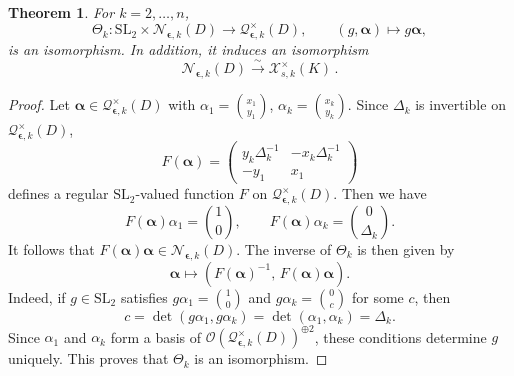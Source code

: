 \documentclass[12pt,reqno]{amsart}
\newcommand{\BC}{\mathbb{C}}
\newcommand{\calN}{\mathcal{N}}
\newcommand{\calQ}{\mathcal{Q}}
\newcommand{\calX}{\mathcal{X}}
\newcommand{\SL}{\mathrm{SL}}
\newcommand{\Spec}{\mathrm{Spec}}
\newtheorem{theorem}{Theorem}[section]
\theoremstyle{definition}
\begin{document}
	
	\begin{theorem} \label{thm:normalizedchart}
		For $k=2,\ldots,n$, 
		$$
		\Theta_k: \SL_2 \times\calN_{\boldsymbol{\epsilon},k}(D)\longrightarrow \calQ^\times_{{\boldsymbol{\epsilon}},k}(D),\qquad
		(g,\boldsymbol{\alpha})\longmapsto g\boldsymbol{\alpha},
		$$
		is an isomorphism.  %
		In addition, it induces an isomorphism
		$$
		\calN_{\boldsymbol{\epsilon},k}(D) \overset{\sim}{\longrightarrow} \calX_{s,k}^\times(K)\,.
		$$
	\end{theorem}
	
	\begin{proof}
		Let	$\boldsymbol{\alpha}\in \calQ^\times_{{\boldsymbol{\epsilon}},k}(D)$ with $
		\alpha_{1}	= \binom{x_1}{y_1}$, $\alpha_{k} =\binom{x_{k}}{y_{k}}$.
		Since $\Delta_k$ is invertible on $\calQ^\times_{{\boldsymbol{\epsilon}},k}(D)$,
		$$
		F(\boldsymbol{\alpha}) 	=
		\begin{pmatrix}
			y_{k}\Delta_k^{-1}	& 	-x_{k}\Delta_k^{-1} \\
			-y_{1}		& 		x_{1}
		\end{pmatrix}
		$$
		defines a regular $\SL_2$-valued function $F$ on $\calQ^\times_{{\boldsymbol{\epsilon}},k}(D)$.
		Then we have
		$$
		F(\boldsymbol{\alpha})\alpha_{1} = \binom{1}{0},	\qquad
		F(\boldsymbol{\alpha})\alpha_{k} = \binom{0}{\Delta_k}.
		$$
		It follows that	$F(\boldsymbol{\alpha})\boldsymbol{\alpha} \in	\calN_{\boldsymbol{\epsilon},k}(D)$. The inverse of $\Theta_k$ is then  given by
		$$
		\boldsymbol{\alpha}	\longmapsto	(F(\boldsymbol{\alpha})^{-1}, \, F(\boldsymbol{\alpha})\boldsymbol{\alpha}).
		$$
		Indeed, if $g\in\SL_2$ satisfies $g\alpha_{1} = \binom{1}{0}$ and $g\alpha_{k} = \binom{0}{c}$ for some $c$,
		then 
		$$
		c =	\det \left(g\alpha_{1},	g\alpha_{k}	\right) = \det \left(\alpha_{1}, \alpha_{k} \right) = \Delta_k.
		$$
		Since $\alpha_1$ and $\alpha_k$ form a basis of
		$\mathcal O({\calQ^\times_{{\boldsymbol{\epsilon}},k}(D)})^{\oplus2 }$,  these conditions determine $g$ uniquely. This proves that $\Theta_k$ is an isomorphism.


\end{proof}
\end{document}
